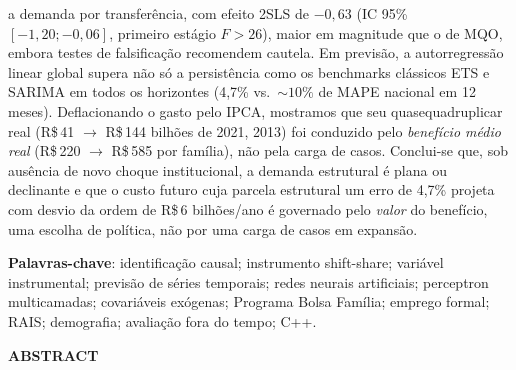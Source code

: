 \documentclass[12pt,a4paper,oneside]{article}
\begin{document}
a demanda por transferência, com efeito 2SLS de $-0{,}63$
(IC 95\% $[-1{,}20;-0{,}06]$, primeiro estágio $F>26$), maior em magnitude
que o de MQO, embora testes de falsificação recomendem cautela. Em previsão,
a autorregressão linear global supera não só a persistência como os
benchmarks clássicos ETS e SARIMA em todos os horizontes (4,7\% vs.\
${\sim}10\%$ de MAPE nacional em 12 meses). Deflacionando o gasto pelo IPCA,
mostramos que seu quase\-quadruplicar real (R\$\,41 $\to$ R\$\,144 bilhões de
2021, 2013\textendash 2024) foi conduzido pelo \emph{benefício médio real}
(R\$\,220 $\to$ R\$\,585 por família), não pela carga de casos. Conclui-se
que, sob ausência de novo choque institucional, a demanda estrutural é plana
ou declinante e que o custo futuro \textemdash{} cuja parcela estrutural um
erro de 4,7\% projeta com desvio da ordem de R\$\,6 bilhões/ano \textemdash{}
é governado pelo \emph{valor} do benefício, uma escolha de política, não por
uma carga de casos em expansão.

\medskip

\noindent\textbf{Palavras-chave}: identificação causal; instrumento
shift-share; variável instrumental; previsão de séries temporais; redes
neurais artificiais; perceptron multicamadas; covariáveis exógenas;
Programa Bolsa Família; emprego formal; RAIS; demografia; avaliação fora
do tempo; C++.

\bigskip

\begin{center}
{\bfseries ABSTRACT}
\end{center}
\end{document}

